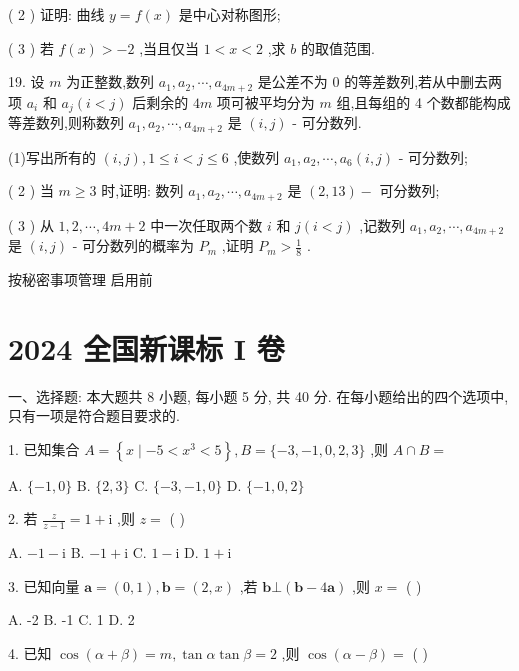 \documentclass[10pt]{article}
\begin{document}
( 2 ) 证明: 曲线 \(y = f\left( x\right)\) 是中心对称图形;

( 3 ) 若 \(f\left( x\right)  >  - 2\) ,当且仅当 \(1 < x < 2\) ,求 \(b\) 的取值范围.

19. 设 \(m\) 为正整数,数列 \({a}_{1},{a}_{2},\cdots ,{a}_{{4m} + 2}\) 是公差不为 0 的等差数列,若从中删去两项 \({a}_{i}\) 和 \({a}_{j}\left( {i < j}\right)\) 后剩余的 \({4m}\) 项可被平均分为 \(m\) 组,且每组的 4 个数都能构成等差数列,则称数列 \({a}_{1},{a}_{2},\cdots ,{a}_{{4m} + 2}\) 是 \(\left( {i,j}\right)\) - 可分数列.

(1)写出所有的 \(\left( {i,j}\right) ,1 \leq  i < j \leq  6\) ,使数列 \({a}_{1},{a}_{2},\cdots ,{a}_{6}\left( {i,j}\right)\) - 可分数列;

( 2 ) 当 \(m \geq  3\) 时,证明: 数列 \({a}_{1},{a}_{2},\cdots ,{a}_{{4m} + 2}\) 是 \(\left( {2,{13}}\right)  -\) 可分数列;

( 3 ) 从 \(1,2,\cdots ,{4m} + 2\) 中一次任取两个数 \(i\) 和 \(j\left( {i < j}\right)\) ,记数列 \({a}_{1},{a}_{2},\cdots ,{a}_{{4m} + 2}\) 是 \(\left( {i,j}\right)\) - 可分数列的概率为 \({P}_{m}\) ,证明 \({P}_{m} > \frac{1}{8}\) .

按秘密事项管理  启用前

\section*{2024 全国新课标 I 卷}

一、选择题: 本大题共 8 小题, 每小题 5 分, 共 40 分. 在每小题给出的四个选项中, 只有一项是符合题目要求的.

1. 已知集合 \(A = \left\{  {x \mid   - 5 < {x}^{3} < 5}\right\}  ,B = \{  - 3, - 1,0,2,3\}\) ,则 \(A \cap  B =\)

A. \(\{  - 1,0\}\) B. \(\{ 2,3\}\) C. \(\{  - 3, - 1,0\}\) D. \(\{  - 1,0,2\}\)

2. 若 \(\frac{z}{z - 1} = 1 + \mathrm{i}\) ,则 \(z =\) ( )

A. \(- 1 - \mathrm{i}\) B. \(- 1 + \mathrm{i}\) C. \(1 - \mathrm{i}\) D. \(1 + \mathrm{i}\)

3. 已知向量 \(\mathbf{a} = \left( {0,1}\right) ,\mathbf{b} = \left( {2,x}\right)\) ,若 \(\mathbf{b} \bot  \left( {\mathbf{b} - 4\mathbf{a}}\right)\) ,则 \(x =\) ( )

A. -2 B. -1 C. 1 D. 2

4. 已知 \(\cos \left( {\alpha  + \beta }\right)  = m,\tan \alpha \tan \beta  = 2\) ,则 \(\cos \left( {\alpha  - \beta }\right)  =\) ( )
\end{document}

